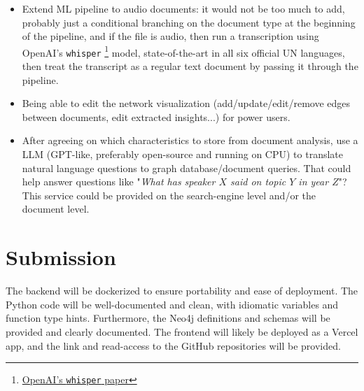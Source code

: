 \documentclass[11pt]{article}
\begin{document}
\begin{itemize}
    \item Extend ML pipeline to audio documents: it would not be too much to add, probably just a conditional branching on the document type at the beginning of the pipeline, and if the file is audio, then run a transcription using OpenAI's \texttt{whisper} \footnote{\href{https://cdn.openai.com/papers/whisper.pdf}{OpenAI's \texttt{whisper} paper}} model, state-of-the-art in all six official UN languages, then treat the transcript as a regular text document by passing it through the pipeline.

    \item Being able to edit the network visualization (add/update/edit/remove edges between documents, edit extracted insights...) for power users.
    
    \item After agreeing on which characteristics to store from document analysis, use a LLM (GPT-like, preferably open-source and running on CPU) to translate natural language questions to graph database/document queries. That could help answer questions like "\textit{What has speaker $X$ said on topic $Y$ in year $Z$}"? This service could be provided on the search-engine level and/or the document level.
\end{itemize}

\section{Submission}

The backend will be dockerized to ensure portability and ease of deployment. The Python code will be well-documented and clean, with idiomatic variables and function type hints. Furthermore, the Neo4j definitions and schemas will be provided and clearly documented. The frontend will likely be deployed as a Vercel app, and the link and read-access to the GitHub repositories will be provided.
\end{document}

